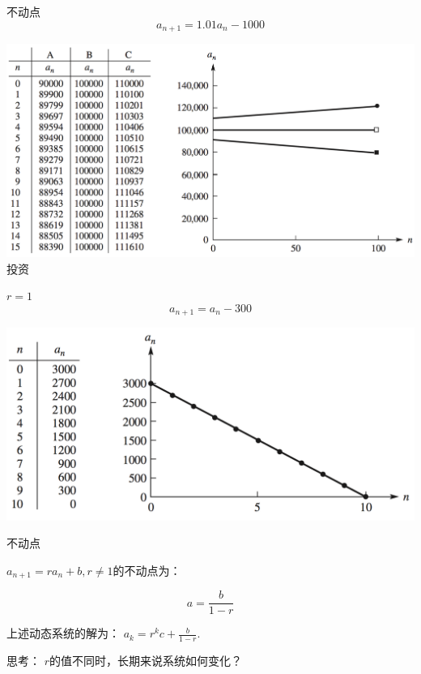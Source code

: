 \documentclass[UTF8, mathserif]{ctexbeamer}
\begin{document}
\begin{frame}{不动点}
\[
a_{n+1} = 1.01a_n -1000
\]
  \begin{center}
    \includegraphics[width=.8\textwidth{}]{invest.png}\\
    投资
  \end{center}
  
\end{frame}

\begin{frame}{$r = 1$}
\[
a_{n+1} = a_n -300
\]
  \begin{center}
    \includegraphics[width=.8\textwidth{}]{poor.png}
  \end{center}
  
\end{frame}

\begin{frame}{不动点}

$a_{n+1} = ra_n + b, r \neq 1$的不动点为：

\[
a = \frac{b}{1-r}
\]

上述动态系统的解为： $a_k=r^kc+\frac{b}{1-r}$.

思考： $r$的值不同时，长期来说系统如何变化？
  
\end{frame}
\end{document}
